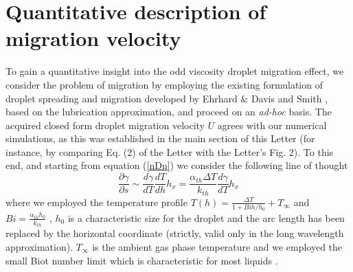 \documentclass[%
 amsmath,amssymb,
 aps,
10.5pt]{revtex4-2}
\def\rr#1{(\ref{#1})}
\newcommand{\be}{\begin{equation}}
\newcommand{\ee}{\end{equation}}
\begin{document}
\section{Quantitative description of migration velocity}
To gain a quantitative insight into the odd viscosity droplet migration effect, we consider the problem of migration by employing the existing formulation
of droplet spreading and migration developed by Ehrhard \& Davis \cite{Ehrhard1991} and Smith \cite{Smith1995}, based on the lubrication approximation, 
and proceed on an \emph{ad-hoc} basis. 
The acquired closed form droplet migration velocity $U$ agrees with our numerical simulations, as this was established in
the main section of this Letter (for instance, by comparing Eq. (2) of the Letter with the Letter's Fig. 2). To this end, and starting from equation \rr{nDn} we consider the 
following line of thought
\be
\frac{\partial \gamma}{\partial s}\sim \frac{d \gamma}{dT}\frac{dT}{dh}h_x = 
\frac{\alpha_{th} \Delta T }{k_{th}} \frac{d\gamma}{dT} h_x
\ee
where we employed the temperature profile $T(h) = \frac{\Delta T}{1 + Bi h/h_0} + T_\infty$
and $Bi = \frac{\alpha_{th} h_0}{k_{th}}$
\cite{Ehrhard1991}, $h_0$ is a characteristic size for the droplet and the arc length has been replaced
by the horizontal coordinate (strictly, valid only in the long wavelength approximation). $T_\infty$ is the 
ambient gas phase temperature {and we employed the small Biot number limit which is characteristic for
most liquids \cite{Oron1997}.  }
\end{document}
